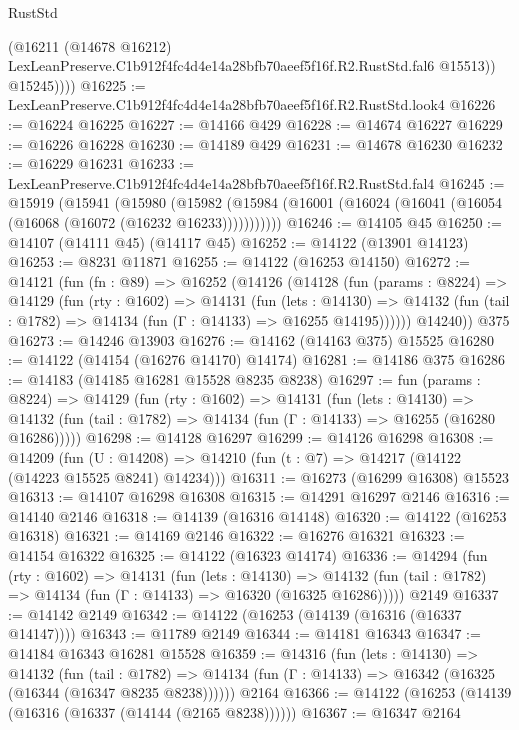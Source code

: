 \begin{lexlean}{RustStd}
\begin{coremodule}
              (@16211
                (@14678 @16212)
                LexLeanPreserve.C1b912f4fc4d4e14a28bfb70aeef5f16f.R2.RustStd.fal6
                @15513))
            @15245))))
@16225 := LexLeanPreserve.C1b912f4fc4d4e14a28bfb70aeef5f16f.R2.RustStd.look4
@16226 := @16224 @16225
@16227 := @14166 @429
@16228 := @14674 @16227
@16229 := @16226 @16228
@16230 := @14189 @429
@16231 := @14678 @16230
@16232 := @16229 @16231
@16233 := LexLeanPreserve.C1b912f4fc4d4e14a28bfb70aeef5f16f.R2.RustStd.fal4
@16245 := @15919
    (@15941
      (@15980
        (@15982 (@15984 (@16001 (@16024 (@16041 (@16054 (@16068 (@16072 (@16232 @16233)))))))))))
@16246 := @14105 @45
@16250 := @14107 (@14111 @45) (@14117 @45)
@16252 := @14122 (@13901 @14123)
@16253 := @8231 @11871
@16255 := @14122 (@16253 @14150)
@16272 := @14121
    (fun (fn : @89) =>
    @16252
      (@14126
        (@14128
          (fun (params : @8224) =>
          @14129
            (fun (rty : @1602) =>
            @14131
              (fun (lets : @14130) =>
              @14132 (fun (tail : @1782) => @14134 (fun (Γ : @14133) => @16255 @14195))))))
        @14240))
    @375
@16273 := @14246 @13903
@16276 := @14162 (@14163 @375) @15525
@16280 := @14122 (@14154 (@16276 @14170) @14174)
@16281 := @14186 @375
@16286 := @14183 (@14185 @16281 @15528 @8235 @8238)
@16297 := fun (params : @8224) =>
  @14129
    (fun (rty : @1602) =>
    @14131
      (fun (lets : @14130) =>
      @14132 (fun (tail : @1782) => @14134 (fun (Γ : @14133) => @16255 (@16280 @16286)))))
@16298 := @14128 @16297
@16299 := @14126 @16298
@16308 := @14209
    (fun (U : @14208) => @14210 (fun (t : @7) => @14217 (@14122 (@14223 @15525 @8241) @14234)))
@16311 := @16273 (@16299 @16308) @15523
@16313 := @14107 @16298 @16308
@16315 := @14291 @16297 @2146
@16316 := @14140 @2146
@16318 := @14139 (@16316 @14148)
@16320 := @14122 (@16253 @16318)
@16321 := @14169 @2146
@16322 := @16276 @16321
@16323 := @14154 @16322
@16325 := @14122 (@16323 @14174)
@16336 := @14294
    (fun (rty : @1602) =>
    @14131
      (fun (lets : @14130) =>
      @14132 (fun (tail : @1782) => @14134 (fun (Γ : @14133) => @16320 (@16325 @16286)))))
    @2149
@16337 := @14142 @2149
@16342 := @14122 (@16253 (@14139 (@16316 (@16337 @14147))))
@16343 := @11789 @2149
@16344 := @14181 @16343
@16347 := @14184 @16343 @16281 @15528
@16359 := @14316
    (fun (lets : @14130) =>
    @14132
      (fun (tail : @1782) =>
      @14134 (fun (Γ : @14133) => @16342 (@16325 (@16344 (@16347 @8235 @8238))))))
    @2164
@16366 := @14122 (@16253 (@14139 (@16316 (@16337 (@14144 (@2165 @8238))))))
@16367 := @16347 @2164

\end{coremodule}
\end{lexlean}
